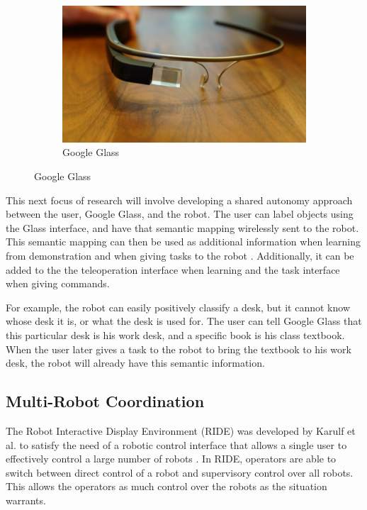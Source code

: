 \documentclass{article}
\begin{document}
\begin{figure}
\begin{subfigure}{0.25\columnwidth}
\includegraphics[width=1.0\columnwidth]{Google_Glass_Explorer_Edition}
\caption{Google Glass}
\label{Glass}
\end{subfigure}
\end{figure}

This next focus of research will involve developing a shared autonomy approach between the user, Google Glass, and the robot. The user can label objects using the Glass interface, and have that semantic mapping wirelessly sent to the robot. This semantic mapping can then be used as additional information when learning from demonstration and when giving tasks to the robot \cite{5654900}. Additionally, it can be added to the the teleoperation interface when learning and the task interface when giving commands.

For example, the robot can easily positively classify a desk, but it cannot know whose desk it is, or what the desk is used for. The user can tell Google Glass that this particular desk is his work desk, and a specific book is his class textbook. When the user later gives a task to the robot to bring the textbook to his work desk, the robot will already have this semantic information. 

\subsection{Multi-Robot Coordination}
The Robot Interactive Display Environment (RIDE) was developed by Karulf et al. to satisfy the need of a robotic control interface that allows a single user to effectively control a large number of robots \cite{hri11c}. In RIDE, operators are able to switch between direct control of a robot and supervisory control over all robots. This allows the operators as much control over the robots as the situation warrants.
\end{document}
